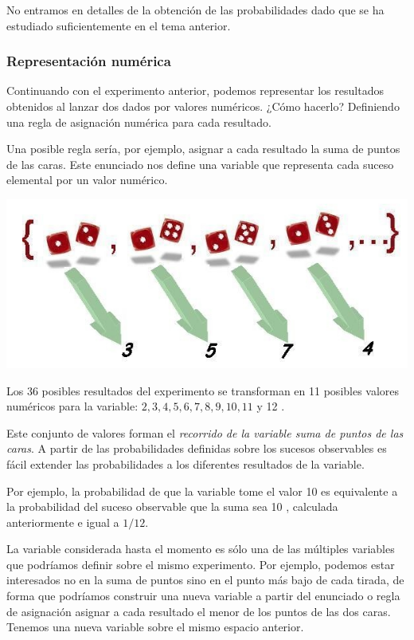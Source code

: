 \documentclass[
]{article}
\begin{document}
No entramos en detalles de la obtención de las probabilidades dado que
se ha estudiado suficientemente en el tema anterior.

\subsubsection{Representación numérica}\label{representaciuxf3n-numuxe9rica}

Continuando con el experimento anterior, podemos representar los
resultados obtenidos al lanzar dos dados por valores numéricos. ¿Cómo
hacerlo? Definiendo una regla de asignación numérica para cada
resultado.

Una posible regla sería, por ejemplo, asignar a cada resultado la suma
de puntos de las caras. Este enunciado nos define una variable que
representa cada suceso elemental por un valor numérico.

\includegraphics{images/clipboard-2572516778.png}

Los 36 posibles resultados del experimento se transforman en 11 posibles
valores numéricos para la variable: \(2,3,4,5,6,7,8,9,10,11\) y 12 .

Este conjunto de valores forman el \emph{recorrido de la variable suma de
puntos de las caras}. A partir de las probabilidades definidas sobre los
sucesos observables es fácil extender las probabilidades a los
diferentes resultados de la variable.

Por ejemplo, la probabilidad de que la variable tome el valor 10 es
equivalente a la probabilidad del suceso observable que la suma sea 10 ,
calculada anteriormente e igual a \(1 / 12\).

La variable considerada hasta el momento es sólo una de las múltiples
variables que podríamos definir sobre el mismo experimento. Por ejemplo,
podemos estar interesados no en la suma de puntos sino en el punto más
bajo de cada tirada, de forma que podríamos construir una nueva variable
a partir del enunciado o regla de asignación asignar a cada resultado el
menor de los puntos de las dos caras. Tenemos una nueva variable sobre
el mismo espacio anterior.
\end{document}
